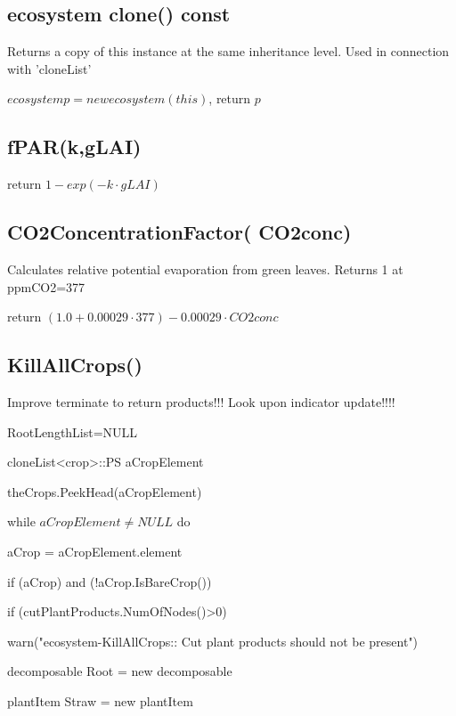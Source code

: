 \documentclass[%
]{scrartcl}
\begin{document}


\subsection{ecosystem  clone() const}
Returns a copy of this instance at the same inheritance level.
Used in connection with 'cloneList'

	$ecosystem   p = new ecosystem(this)$, 
	return $p$


\subsection{fPAR(k,gLAI)}	
return $1-exp(-k \cdot gLAI)$




\subsection{CO2ConcentrationFactor(  CO2conc)}
Calculates relative potential evaporation from green leaves.
Returns 1 at ppmCO2=377

   return $(1.0+0.00029 \cdot 377)-0.00029 \cdot CO2conc$






\subsection{KillAllCrops()}
Improve terminate to return products!!!
Look upon indicator update!!!!

    RootLengthList=NULL

   cloneList<crop>::PS aCropElement

   theCrops.PeekHead(aCropElement)

   while $aCropElement\ne NULL$ do
 
      aCrop = aCropElement.element

      if (aCrop) and
              (!aCrop.IsBareCrop())
         
            if (cutPlantProducts.NumOfNodes()>0)
        
 \quad    
  warn("ecosystem-KillAllCrops:: Cut plant products should not be present")
            
decomposable   Root = new decomposable
          
  plantItem   Straw = new plantItem
           
\end{document}
